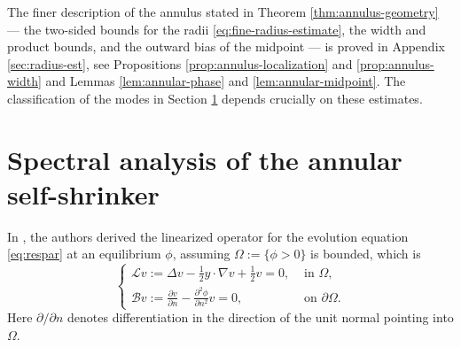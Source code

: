 \documentclass[11pt]{article}
\numberwithin{equation}{section}
\theoremstyle{definition}
\begin{document}
The finer description of the annulus stated in Theorem \ref{thm:annulus-geometry} --- the two-sided bounds for the radii \eqref{eq:fine-radius-estimate}, the width and product bounds, and the outward bias of the midpoint --- is proved in Appendix \ref{sec:radius-est}, see Propositions \ref{prop:annulus-localization} and \ref{prop:annulus-width} and Lemmas \ref{lem:annular-phase} and \ref{lem:annular-midpoint}. The classification of the modes in Section \ref{sec:instability} depends crucially on these estimates.


\section{Spectral analysis of the annular self-shrinker}\label{sec:instability}
In \cite[Section 2]{stability}, the authors derived the linearized operator for the evolution equation \eqref{eq:respar} at an equilibrium $\phi$, assuming $\Omega :=\{\phi>0\}$ is bounded, which is
\begin{equation}\label{eq:linear-stability}
    \left\{\begin{array}{ll}
       \mathscr{L} v := \Delta v - \frac{1}{2} y \cdot \nabla v + \frac{1}{2} v = 0,  & \text{ in } \Omega,  \\[5pt]
       \mathscr{B} v := \frac{\partial v}{\partial n} - 
    	\frac{\partial^2 \phi}{\partial n^2} v = 0,  & \text{ on } \partial\Omega.
    \end{array} \right.\tag{L}
\end{equation}
Here \(\partial/\partial n\) denotes differentiation in the direction of the unit normal pointing into \(\Omega\).  
\end{document}
